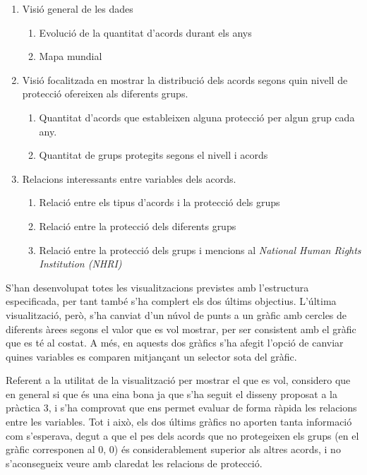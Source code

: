 \documentclass{article}
\begin{document}
\begin{enumerate}
    \item Visió general de les dades
        \begin{enumerate}
            \item Evolució de la quantitat d'acords durant els anys
            \item Mapa mundial
        \end{enumerate}
    \item Visió focalitzada en mostrar la distribució dels acords segons quin
        nivell de protecció ofereixen als diferents grups.
        \begin{enumerate}
            \item Quantitat d'acords que estableixen alguna protecció per algun
                grup cada any.
            \item Quantitat de grups protegits segons el nivell i acords
        \end{enumerate}
    \item Relacions interessants entre variables dels acords.
        \begin{enumerate}
            \item Relació entre els tipus d'acords i la protecció dels grups
            \item Relació entre la protecció dels diferents grups
            \item Relació entre la protecció dels grups i mencions al
                \textit{National Human Rights Institution (NHRI)}
        \end{enumerate}
\end{enumerate}

S'han desenvolupat totes les visualitzacions previstes amb l'estructura
especificada, per tant també s'ha complert els dos últims objectius. L'última
visualització, però, s'ha canviat d'un núvol de punts a un gràfic amb cercles
de diferents àrees segons el valor que es vol mostrar, per ser consistent amb
el gràfic que es té al costat. A més, en aquests dos gràfics s'ha afegit
l'opció de canviar quines variables es comparen mitjançant un selector sota
del gràfic.

Referent a la utilitat de la visualització per mostrar el que es vol, considero
que en general si que és una eina bona ja que s'ha seguit el disseny proposat a
la pràctica 3, i s'ha comprovat que ens permet evaluar de forma ràpida les
relacions entre les variables. Tot i això, els dos últims gràfics no aporten
tanta informació com s'esperava, degut a que el pes dels acords que no
protegeixen els grups (en el gràfic corresponen al 0, 0) és considerablement
superior als altres acords, i no s'aconsegueix veure amb claredat les relacions
de protecció.
\end{document}
